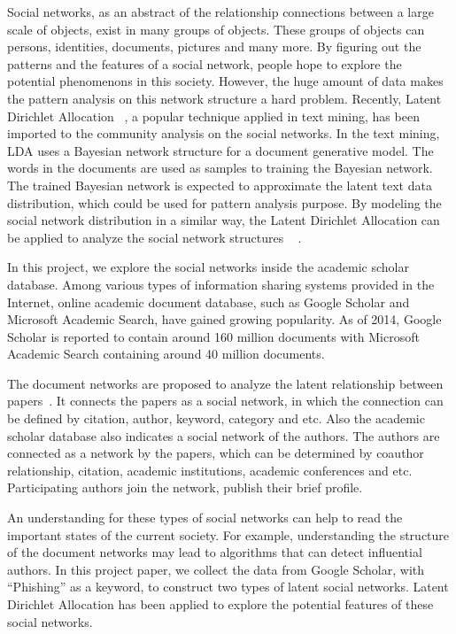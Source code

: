 \documentclass[letterpaper]{article}
\begin{document}
Social networks, as an abstract of the relationship connections between a large scale of objects, exist in many groups of objects.
These groups of objects can persons, identities, documents, pictures and many more.
By figuring out the patterns and the features of a social network, people hope to explore the potential phenomenons in this society.
However, the huge amount of data makes the pattern analysis on this network structure a hard problem.
Recently, Latent Dirichlet Allocation~\cite{Blei:2003:LDA:944919.944937} , a popular technique applied in text mining, has been imported to the community analysis on the social networks.
In the text mining, LDA uses a Bayesian network structure for a document generative model.
The words in the documents are used as samples to training the Bayesian network.
The trained Bayesian network is expected to approximate the latent text data distribution, which could be used for pattern analysis purpose.
By modeling the social network distribution in a similar way, the Latent Dirichlet Allocation can be applied to analyze the social network structures
~\cite{4258697} \cite{Cha:2012:SAU:2348283.2348360} \cite{Henderson:2009:ALD:1529282.1529607}.

In this project, we explore the social networks inside the academic scholar database.
Among various types of information sharing systems provided in the Internet, online academic document database, such as Google Scholar and Microsoft Academic Search, have gained growing popularity.
As of 2014, Google Scholar is reported to contain around 160 million documents with Microsoft Academic Search containing around 40 million documents. 

The document networks are proposed to analyze the latent relationship between papers~\cite{chang2009relational}.
It connects the papers as a social network, in which the connection can be defined by citation, author, keyword, category and etc.
Also the academic scholar database also indicates a social network of the authors.
The authors are connected as a network by the papers, which can be determined by coauthor relationship, citation, academic institutions, academic conferences and etc.
Participating authors join the network, publish their brief profile.

An understanding for these types of social networks can help to read the important states of the current society.
For example, understanding the structure of the document networks may lead to algorithms that can detect influential authors.
In this project paper, we collect the data from Google Scholar, with ``Phishing'' as a keyword, to construct two types of latent social networks.
Latent Dirichlet Allocation has been applied to explore the potential features of these social networks.
\end{document}
